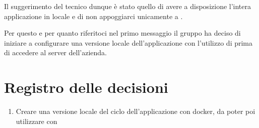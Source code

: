 \documentclass{article}
\begin{document}
Il suggerimento del tecnico dunque è stato quello di avere a disposizione l'intera applicazione in locale e di non appoggiarci unicamente a .

Per questo e per quanto riferitoci nel primo messaggio il gruppo ha deciso di iniziare a configurare una versione locale dell'applicazione con l'utilizzo di  prima di accedere al server dell'azienda.


\newpage
\section{Registro delle decisioni}%
\label{sec:registro_delle_decisioni}

\begin{enumerate}
  \item Creare una versione locale del ciclo dell'applicazione con docker, da poter poi utilizzare con 
\end{enumerate}
\end{document}

